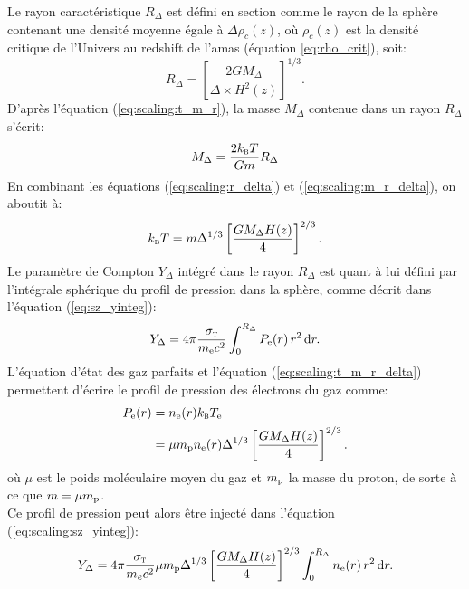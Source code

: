 Le rayon caractéristique $R_\Delta$ est défini en section  comme le rayon de la sphère contenant une densité moyenne égale à $\Delta \rho_c(z)$, où $\rho_c(z)$ est la densité critique de l'Univers au redshift de l'amas (équation \ref{eq:rho_crit}), soit:
\begin{equation}
    \label{eq:scaling:r_delta}
    R_\Delta = \left[ \frac{2GM_\Delta}{\Delta \times H^2(z)} \right]^{1/3}.
\end{equation}
D'après l'équation (\ref{eq:scaling:t_m_r}), la masse $M_\Delta$ contenue dans un rayon $R_\Delta$ s'écrit:
\begin{equation}
    \label{eq:scaling:m_r_delta}
    M_\Delta = \frac{2 k_\textsc{b} T}{Gm} R_\Delta
\end{equation}
En combinant les équations (\ref{eq:scaling:r_delta}) et (\ref{eq:scaling:m_r_delta}), on aboutit à:
\begin{equation}
    \label{eq:scaling:t_m_r_delta}
    k_\textsc{b} T = m \Delta^{1/3} \left[\frac{G M_\Delta H(z)}{4}\right]^{2/3}.
\end{equation}
Le paramètre de Compton $Y_\Delta$ intégré dans le rayon $R_\Delta$ est quant à lui défini par l'intégrale sphérique du profil de pression dans la sphère, comme décrit dans l'équation (\ref{eq:sz_yinteg}):
\begin{equation}
    \label{eq:scaling:sz_yinteg}
    Y_\Delta = 4\pi \frac{\sigma_\textsc{t}}{m_{\rm e} c^2} \int_0^{R_\Delta} P_{\rm e}(r) \, r^2 \, \mathrm{d} r.
\end{equation}
L'équation d'état des gaz parfaits et l'équation (\ref{eq:scaling:t_m_r_delta}) permettent d'écrire le profil de pression des électrons du gaz comme:
\begin{align}
    \nonumber P_{\rm e}(r) &= n_{\rm e}(r) k_\textsc{b} T_{\rm e} \\
              &= \mu m_{\rm p} n_{\rm e}(r) \Delta^{1/3} \left[\frac{G M_\Delta H(z)}{4}\right]^{2/3}.
\end{align}
où $\mu$ est le poids moléculaire moyen du gaz et $m_{\rm p}$ la masse du proton, de sorte à ce que $m = \mu m_{\rm p}$. \\
Ce profil de pression peut alors être injecté dans l'équation (\ref{eq:scaling:sz_yinteg}):
\begin{equation}
    Y_\Delta = 4\pi \frac{\sigma_\textsc{t}}{m_e c^2} \mu m_{\rm p} \Delta^{1/3} \left[\frac{G M_\Delta H(z)}{4}\right]^{2/3} \int_0^{R_\Delta} n_{\rm e}(r) \, r^2 \, \mathrm{d} r.
\end{equation}
